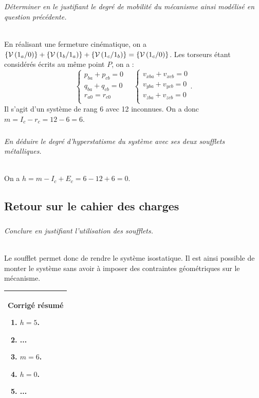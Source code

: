 \documentclass[10pt,fleqn]{article} %
\begin{document}
\begin{multicols}{2}
\subparagraph{}\textit{Déterminer en le justifiant le degré de mobilité du mécanisme ainsi modélisé en question précédente.}
\ifprof
\begin{corrige} ~\\
En réalisant une fermeture cinématique, on a $\left\{\mathcal{V} \left(1_a/0 \right) \right\}+\left\{\mathcal{V} \left(1_b/1_a \right) \right\}+\left\{\mathcal{V} \left(1_c/1_b \right) \right\}=\left\{\mathcal{V} \left(1_c/0 \right) \right\}$. 
Les torseurs étant considérés écrits au même point $P$, on a : 
$$
\left\{ 
\begin{array}{l}
p_{ba}+p_{cb}=0 \\
q_{ba}+q_{cb}=0 \\
r_{a0}=r_{c0}\\
\end{array}
\right. 
\quad
\left\{ 
\begin{array}{l}
v_{xba} + v_{xcb}=0\\
v_{yba} + v_{ycb}=0\\
v_{zba} + v_{zcb}=0\\
\end{array}
\right. .
$$
Il s'agit d'un système de rang 6 avec 12 inconnues. On a donc $m=I_c-r_c=12-6=6$.
\end{corrige}
\else
\fi


\subparagraph{}\textit{En déduire le degré d’hyperstatisme du système avec ses deux soufflets métalliques.}
\ifprof
\begin{corrige} ~\\
On a $h=m-I_c+E_c = 6-12+6 = 0$.
\end{corrige}
\else
\fi



\subsection*{Retour sur le cahier des charges}



\subparagraph{}\textit{Conclure en justifiant l’utilisation des soufflets.}
\ifprof
\begin{corrige} ~\\
Le soufflet permet donc de rendre le système isostatique. Il est ainsi possible de monter le système sans avoir à imposer des contraintes géométriques sur le mécanisme. 
\end{corrige}
\else
\fi


\ifprof
\else
\begin{center}
\begin{tabular}{|p{.95\linewidth}|}
\hline
\textbf{Corrigé résumé}
\begin{enumerate}
\item $h=5$.
\item ...
\item $m=6$.
\item $h=0$.
\item ...
\end{enumerate} \\
\hline
\end{tabular}
\end{center}
\fi

\end{multicols}
\end{document}
